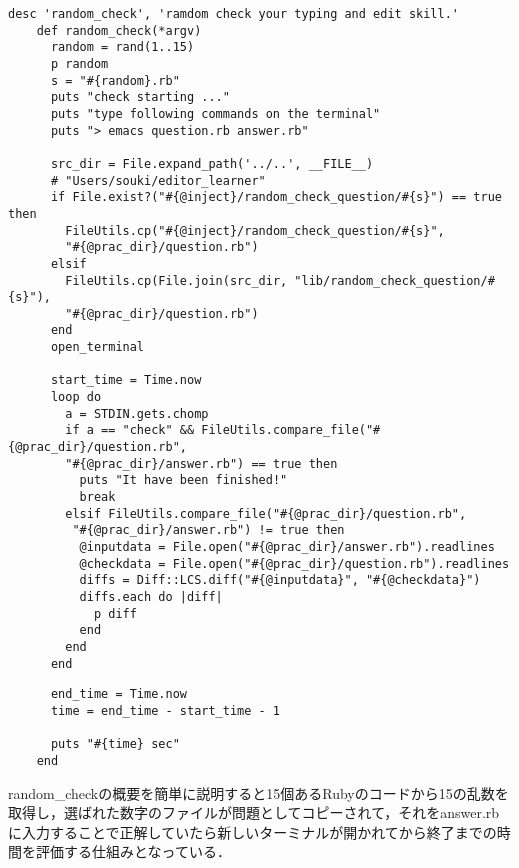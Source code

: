 \begin{screen}
{\small
\begin{verbatim}
desc 'random_check', 'ramdom check your typing and edit skill.'
    def random_check(*argv)
      random = rand(1..15)
      p random
      s = "#{random}.rb"
      puts "check starting ..."
      puts "type following commands on the terminal"
      puts "> emacs question.rb answer.rb"

      src_dir = File.expand_path('../..', __FILE__) 
      # "Users/souki/editor_learner"
      if File.exist?("#{@inject}/random_check_question/#{s}") == true then
        FileUtils.cp("#{@inject}/random_check_question/#{s}", 
        "#{@prac_dir}/question.rb")
      elsif
        FileUtils.cp(File.join(src_dir, "lib/random_check_question/#{s}"),  
        "#{@prac_dir}/question.rb")
      end
      open_terminal
      
      start_time = Time.now
      loop do
        a = STDIN.gets.chomp
        if a == "check" && FileUtils.compare_file("#{@prac_dir}/question.rb", 
        "#{@prac_dir}/answer.rb") == true then
          puts "It have been finished!"
          break
        elsif FileUtils.compare_file("#{@prac_dir}/question.rb",
         "#{@prac_dir}/answer.rb") != true then
          @inputdata = File.open("#{@prac_dir}/answer.rb").readlines
          @checkdata = File.open("#{@prac_dir}/question.rb").readlines
          diffs = Diff::LCS.diff("#{@inputdata}", "#{@checkdata}")
          diffs.each do |diff|
            p diff
          end
        end
      end
\end{verbatim}}
\end{screen}
\begin{screen}
{\small
\begin{verbatim}
      end_time = Time.now
      time = end_time - start_time - 1
      
      puts "#{time} sec"
    end
\end{verbatim}}
\end{screen}

random\_checkの概要を簡単に説明すると15個あるRubyのコードから15の乱数を取得し，選ばれた数字のファイルが問題としてコピーされて，それをanswer.rbに入力することで正解していたら新しいターミナルが開かれてから終了までの時間を評価する仕組みとなっている．

